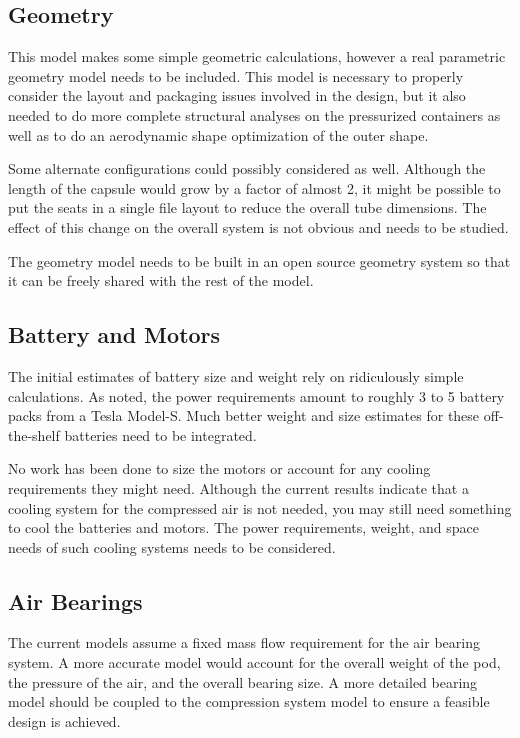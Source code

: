 \documentclass[heading.tex]{subfiles}
\begin{document}
\subsection{Geometry}
This model makes some simple geometric calculations, however a real parametric geometry model needs to be included. This model is
necessary to properly consider the layout and packaging issues involved in the design, but it also needed to do more complete structural
analyses on the pressurized containers as well as to do an aerodynamic shape optimization of the outer shape.

Some alternate configurations could possibly considered as well. Although the length of the capsule would grow by a factor of almost 2, it
might be possible to put the seats in a single file layout to reduce the overall tube dimensions. The effect of this change on the overall
system is not obvious and needs to be studied.

The geometry model needs to be built in an open source geometry system so that it can be freely shared with the rest of the model.

\subsection{Battery and Motors}
The initial estimates of battery size and weight rely on ridiculously simple calculations. As noted, the power requirements amount to roughly
3 to 5 battery packs from a Tesla Model-S. Much better weight and size estimates for these off-the-shelf batteries need to be integrated.

No work has been done to size the motors or account for any cooling requirements they might need. Although the current results indicate
that a cooling system for the compressed air is not needed, you may still need something to cool the batteries and motors. The power
requirements, weight, and space needs of such cooling systems needs to be considered.

\subsection{Air Bearings}
The current models assume a fixed mass flow requirement for the air bearing system. A more accurate model would account for the overall
weight of the pod, the pressure of the air, and the overall bearing size. A more detailed bearing model should be coupled to the
compression system model to ensure a feasible design is achieved.
\end{document}
